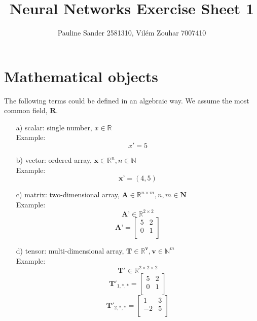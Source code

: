 \documentclass{article}
\title{Neural Networks Exercise Sheet 1}
\author{Pauline Sander 2581310, Vilém Zouhar 7007410}
\begin{document}
\maketitle

\section{Mathematical objects}

The following terms could be defined in an algebraic way. We assume the most common field, $\mathbf{R}$.

\begin{enumerate}
    \item[a)] scalar: single number, $x \in \mathbb{R}$\\
    Example:
    $$
        x'=5
    $$
    
    \item[b)] vector: ordered array, $\textbf{x} \in \mathbb{R}^n, n \in \mathbb{N}$\\
    Example:
    $$
        \textbf{x'}=(4,5)
    $$
    
    \item[c)] matrix: two-dimensional array, $\textbf{A} \in \mathbb{R}^{n\times m}, n, m \in \mathbf{N}$\\
    Example:
        $$
            \textbf{A'} \in \mathbb{R}^{2\times 2}
        $$
        $$
            \textbf{A'} = 
            \begin{bmatrix} 
            5 & 2 \\
            0   & 1\\
            \end{bmatrix}
        $$
        
    \item[d)] tensor: multi-dimensional array, $\mathbf{T} \in \mathbb{R}^\mathbf{v}, \mathbf{v} \in \mathbb{N}^m$\\
    Example:
        $$
            \mathbf{T'} \in \mathbb{R}^{2\times 2 \times 2}
        $$
        $$
            \mathbf{T'}_{1,*,*} =
            \begin{bmatrix} 
            5 & 2 \\
            0   & 1\\
            \end{bmatrix}
        $$
        $$
            \mathbf{T'}_{2,*,*} =
            \begin{bmatrix} 
            1 & 3 \\
            -2 & 5 \\
            \end{bmatrix}
        $$
    
\end{enumerate}
\end{document}
